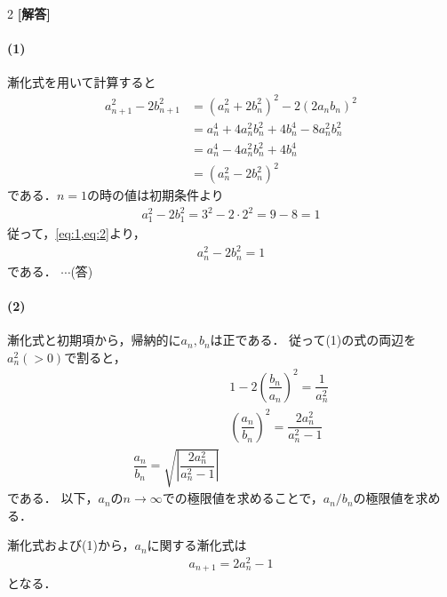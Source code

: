 \documentclass[../../main.tex]{subfiles}
\begin{document}
\setcounter{equation}{0}
\begin{oframed}
  
\end{oframed}
\setlength{\columnseprule}{0.4pt}
\begin{multicols}{2}
  {\bf [解答]}
  \paragraph{(1)}
  漸化式を用いて計算すると
  \begin{align}
    a_{n+1}^2 - 2b_{n+1}^2
    & = (a_n^2 + 2b_n^2)^2 - 2(2a_n b_n)^2           \\
    & = a_n^4 + 4a_n^2 b_n^2 + 4b_n^4 - 8a_n^2 b_n^2 \\
    & = a_n^4 - 4a_n^2 b_n^2 + 4b_n^4                \\
    & = (a_n^2 - 2b_n^2)^2\label{eq:1}
  \end{align}
  である．$n=1$の時の値は初期条件より
  \begin{align}
    a_1^2 - 2b_1^2 = 3^2 - 2 \cdot 2^2 = 9 - 8 = 1 \label{eq:2}
  \end{align}
  従って，\cref{eq:1,eq:2}より，
  \begin{align}
    a_n^2 - 2b_n^2 = 1
  \end{align}
  である． $\cdots$(答)

  \paragraph{(2)}
  漸化式と初期項から，帰納的に$a_n, b_n$は正である．
  従って(1)の式の両辺を$a^2_n(>0)$で割ると，
  \begin{align}
    & 1 - 2\left(\dfrac{b_n}{a_n}\right)^2 = \dfrac{1}{a_n^2}   \\
    & \left(\dfrac{a_n}{b_n}\right)^2 = \dfrac{2a^2_n}{a^2_n-1} \\
    \dfrac{a_n}{b_n} = \sqrt{\left|\dfrac{2a^2_n}{a^2_n-1}\right|} \label{eq:3}
  \end{align}
  である．
  以下，$a_n$の$n\to\infty$での極限値を求めることで，$a_n/b_n$の極限値を求める．

  漸化式および(1)から，$a_n$に関する漸化式は
  \begin{align}
    a_{n+1} = 2a_n^2  - 1 \label{eq:4}
  \end{align}
  となる．


\end{multicols}
\end{document}
